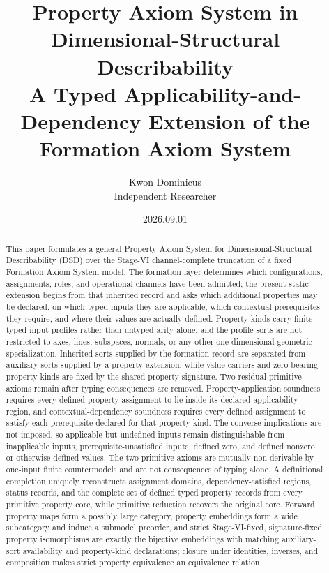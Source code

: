 \documentclass[11pt]{article}
\title{Property Axiom System in Dimensional-Structural Describability\\[0.35em]
\large A Typed Applicability-and-Dependency Extension of the Formation Axiom System}
\author{Kwon Dominicus\\\small Independent Researcher}
\date{2026.09.01}
\theoremstyle{definition}
\theoremstyle{remark}
\begin{document}
\maketitle

\begin{abstract}
This paper formulates a general Property Axiom System for Dimensional-Structural Describability (DSD) over the Stage-VI channel-complete truncation of a fixed Formation Axiom System model.
The formation layer determines which configurations, assignments, roles, and operational channels have been admitted; the present static extension begins from that inherited record and asks which additional properties may be declared, on which typed inputs they are applicable, which contextual prerequisites they require, and where their values are actually defined.
Property kinds carry finite typed input profiles rather than untyped arity alone, and the profile sorts are not restricted to axes, lines, subspaces, normals, or any other one-dimensional geometric specialization.
Inherited sorts supplied by the formation record are separated from auxiliary sorts supplied by a property extension, while value carriers and zero-bearing property kinds are fixed by the shared property signature.
Two residual primitive axioms remain after typing consequences are removed.
Property-application soundness requires every defined property assignment to lie inside its declared applicability region, and contextual-dependency soundness requires every defined assignment to satisfy each prerequisite declared for that property kind.
The converse implications are not imposed, so applicable but undefined inputs remain distinguishable from inapplicable inputs, prerequisite-unsatisfied inputs, defined zero, and defined nonzero or otherwise defined values.
The two primitive axioms are mutually non-derivable by one-input finite countermodels and are not consequences of typing alone.
A definitional completion uniquely reconstructs assignment domains, dependency-satisfied regions, status records, and the complete set of defined typed property records from every primitive property core, while primitive reduction recovers the original core.
Forward property maps form a possibly large category, property embeddings form a wide subcategory and induce a submodel preorder, and strict Stage-VI-fixed, signature-fixed property isomorphisms are exactly the bijective embeddings with matching auxiliary-sort availability and property-kind declarations; closure under identities, inverses, and composition makes strict property equivalence an equivalence relation.

\end{abstract}
\end{document}
